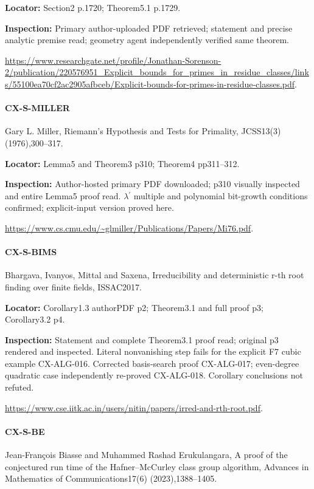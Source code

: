 \documentclass[11pt,a4paper]{article}
\begin{document}
\textbf{Locator:} Section2 p.\allowbreak{}1720; Theorem5.\allowbreak{}1 p.\allowbreak{}1729.

\textbf{Inspection:} Primary author-uploaded PDF retrieved; statement and precise analytic premise read; geometry agent independently verified same theorem.\allowbreak{}

\url{https://www.researchgate.net/profile/Jonathan-Sorenson-2/publication/220576951_Explicit_bounds_for_primes_in_residue_classes/links/55100ea70cf2ac2905afbceb/Explicit-bounds-for-primes-in-residue-classes.pdf}.

\paragraph{CX-S-MILLER} Gary L.\allowbreak{} Miller, Riemann’s Hypothesis and Tests for Primality, JCSS13(3) (1976),300–\allowbreak{}317.

\textbf{Locator:} Lemma5 and Theorem3 p310; Theorem4 pp311–\allowbreak{}312.

\textbf{Inspection:} Author-hosted primary PDF downloaded; p310 visually inspected and entire Lemma5 proof read.\allowbreak{} \ensuremath{\lambda}\ensuremath{{}^{\prime}} multiple and polynomial bit-growth conditions confirmed; explicit-input version proved here.\allowbreak{}

\url{https://www.cs.cmu.edu/~glmiller/Publications/Papers/Mi76.pdf}.

\paragraph{CX-S-BIMS} Bhargava, Ivanyos, Mittal and Saxena, Irreducibility and deterministic r-th root finding over finite fields, ISSAC2017.

\textbf{Locator:} Corollary1.\allowbreak{}3 authorPDF p2; Theorem3.\allowbreak{}1 and full proof p3; Corollary3.\allowbreak{}2 p4.

\textbf{Inspection:} Statement and complete Theorem3.\allowbreak{}1 proof read; original p3 rendered and inspected.\allowbreak{} Literal nonvanishing step fails for the explicit F7 cubic example CX-ALG-016.\allowbreak{} Corrected basis-search proof CX-ALG-017; even-degree quadratic case independently re-proved CX-ALG-018.\allowbreak{} Corollary conclusions not refuted.\allowbreak{}

\url{https://www.cse.iitk.ac.in/users/nitin/papers/irred-and-rth-root.pdf}.

\paragraph{CX-S-BE} Jean-François Biasse and Muhammed Rashad Erukulangara, A proof of the conjectured run time of the Hafner–\allowbreak{}McCurley class group algorithm, Advances in Mathematics of Communications17(6) (2023),1388–\allowbreak{}1405.
\end{document}

